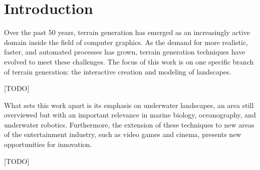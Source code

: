\chapter{Introduction}
\label{chap:introduction}

Over the past 50 years, terrain generation has emerged as an increasingly active domain inside the field of computer graphics. As the demand for more realistic, faster, and automated processes has grown, terrain generation techniques have evolved to meet these challenges. The focus of this work is on one specific branch of terrain generation: the interactive creation and modeling of landscapes.

[TODO]

What sets this work apart is its emphasis on underwater landscapes, an area still overviewed but with an important relevance in marine biology, oceanography, and underwater robotics. Furthermore, the extension of these techniques to new areas of the entertainment industry, such as video games and cinema, presents new opportunities for innovation.

[TODO]

